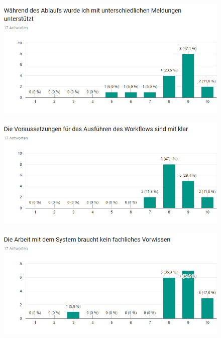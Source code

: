 \begin{figure}[H]
    \centering
    \includegraphics[width=15cm]{diagrams/ErgebnisStat4.jpg}
    \label{Ergebnis4}
\end{figure}

\begin{figure}[H]
    \centering
    \includegraphics[width=15cm]{diagrams/ErgebnisStat5.jpg}
    \label{Ergebnis5}
\end{figure}

\begin{figure}[H]
    \centering
    \includegraphics[width=15cm]{diagrams/ErgebnisStat6.jpg}
    \label{Ergebnis6}
\end{figure}

